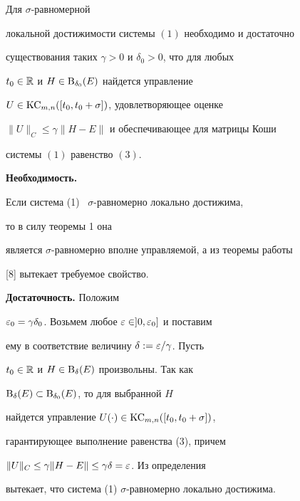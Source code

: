 




\begin{thm}


Для $\sigma$-равномерной


локальной достижимости системы $(1)$ необходимо и достаточно


существования таких $\gamma>0$ и $\delta_0>0$, что для любых


$t_0\in\Bbb R$ и $H\in\mathrm B_{\delta_0}(E)$ найдется управление


$U\in\mathrm{KC}_{m,n}([t_0,t_0+\sigma])$, удовлетворяющее оценке


$\|U\|_C\le\gamma\|H-E\|$ и обеспечивающее для матрицы Коши


системы $(1)$ равенство $(3)$.


\end{thm}





\begin{pf} 


{\bf Необходимость.}


Если система (1) \ $\sigma$-равномерно локально достижима,


то в силу теоремы 1 она


является $\sigma$-равномерно вполне управляемой, а из теоремы работы


[8] вытекает требуемое свойство.


\smallskip





{\bf Достаточность.} Положим


$\varepsilon_0=\gamma\delta_0$. Возьмем любое $\varepsilon\in ]0,\varepsilon_0]$ и поставим


ему в соответствие величину $\delta:= \varepsilon/\gamma$. Пусть


$t_0\in\Bbb R$ и $H\in\mathrm B_{\delta}(E)$ произвольны. Так как


$\mathrm B_{\delta}(E)\subset \mathrm B_{\delta_0}(E)$, то для выбранной $H$


найдется управление $U(\cdot)\in\mathrm{KC}_{m,n}([t_0,t_0+\sigma])$,


гарантирующее выполнение равенства (3), причем


$\|U\|_C\le\gamma\|H-E\|\le\gamma\delta=\varepsilon$. Из определения


вытекает, что система (1) $\sigma$-равномерно локально достижима.


\end{pf}





